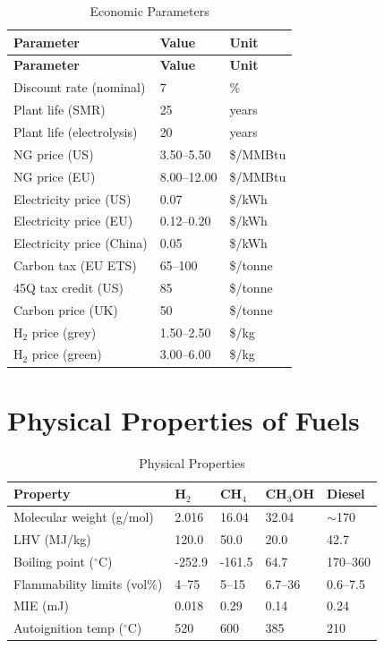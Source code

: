\documentclass[12pt,twoside,openany]{book}
\newcommand{\unitdegree}{\ensuremath{^\circ\mathrm{C}}}
\begin{document}
\begin{longtable}{L{6cm} C{3cm} C{2cm}}
\caption{Economic Parameters}\label{tab:econ_params}\\
\hline
\textbf{Parameter} & \textbf{Value} & \textbf{Unit} \\
\hline
\endfirsthead
\hline
\textbf{Parameter} & \textbf{Value} & \textbf{Unit} \\
\hline
\endhead
Discount rate (nominal)    & 7         & \%          \\
Plant life (SMR)           & 25        & years       \\
Plant life (electrolysis)  & 20        & years       \\
NG price (US)              & 3.50--5.50 & \$/MMBtu   \\
NG price (EU)              & 8.00--12.00 & \$/MMBtu   \\
Electricity price (US)     & 0.07      & \$/kWh      \\
Electricity price (EU)     & 0.12--0.20 & \$/kWh      \\
Electricity price (China)  & 0.05      & \$/kWh      \\
Carbon tax (EU ETS)        & 65--100   & \$/tonne    \\
45Q tax credit (US)        & 85        & \$/tonne    \\
Carbon price (UK)          & 50        & \$/tonne    \\
H$_2$ price (grey)         & 1.50--2.50 & \$/kg      \\
H$_2$ price (green)        & 3.00--6.00 & \$/kg      \\
\hline
\end{longtable}

\section{Physical Properties of Fuels}

\begin{table}[htbp]
    \centering
    \caption{Physical Properties}
    \label{tab:properties}
    \begin{tabular}{L{3.5cm} C{2cm} C{2cm} C{2cm} C{2cm}}
    \hline
    \textbf{Property} & \textbf{H$_2$} & \textbf{CH$_4$}
                      & \textbf{CH$_3$OH} & \textbf{Diesel} \\
    \hline
    Molecular weight (g/mol)   & 2.016  & 16.04  & 32.04      & $\sim$170   \\
    LHV (MJ/kg)                & 120.0  & 50.0   & 20.0       & 42.7        \\
    Boiling point (\unitdegree)& -252.9 & -161.5 & 64.7       & 170--360    \\
    Flammability limits (vol\%)& 4--75  & 5--15  & 6.7--36    & 0.6--7.5    \\
    MIE (mJ)                   & 0.018  & 0.29   & 0.14       & 0.24        \\
    Autoignition temp (\unitdegree)& 520 & 600 & 385 & 210 \\
    \hline
    \end{tabular}
\end{table}
\end{document}

